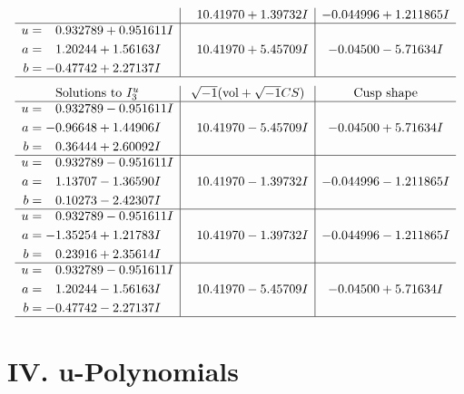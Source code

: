 \documentclass[1p]{elsarticle_modified}
\theoremstyle{definition}
\newcommand{\I}{\sqrt{-1}}
\begin{document}
$$\begin{array}{c|c|c}
 & \phantom{-}10.41970 + 1.39732 I & -0.044996 + 1.211865 I \\ \hline\begin{aligned}
u &= \phantom{-}0.932789 + 0.951611 I \\
a &= \phantom{-}1.20244 + 1.56163 I \\
b &= -0.47742 + 2.27137 I\end{aligned}
 & \phantom{-}10.41970 + 5.45709 I & -0.04500 - 5.71634 I\\
 \hline 
 \end{array}$$\newpage$$\begin{array}{c|c|c}  
\text{Solutions to }I^u_{3}& \I (\text{vol} + \sqrt{-1}CS) & \text{Cusp shape}\\
 \hline 
\begin{aligned}
u &= \phantom{-}0.932789 - 0.951611 I \\
a &= -0.96648 + 1.44906 I \\
b &= \phantom{-}0.36444 + 2.60092 I\end{aligned}
 & \phantom{-}10.41970 - 5.45709 I & -0.04500 + 5.71634 I \\ \hline\begin{aligned}
u &= \phantom{-}0.932789 - 0.951611 I \\
a &= \phantom{-}1.13707 - 1.36590 I \\
b &= \phantom{-}0.10273 - 2.42307 I\end{aligned}
 & \phantom{-}10.41970 - 1.39732 I & -0.044996 - 1.211865 I \\ \hline\begin{aligned}
u &= \phantom{-}0.932789 - 0.951611 I \\
a &= -1.35254 + 1.21783 I \\
b &= \phantom{-}0.23916 + 2.35614 I\end{aligned}
 & \phantom{-}10.41970 - 1.39732 I & -0.044996 - 1.211865 I \\ \hline\begin{aligned}
u &= \phantom{-}0.932789 - 0.951611 I \\
a &= \phantom{-}1.20244 - 1.56163 I \\
b &= -0.47742 - 2.27137 I\end{aligned}
 & \phantom{-}10.41970 - 5.45709 I & -0.04500 + 5.71634 I\\
 \hline 
 \end{array}$$\newpage
\newpage\renewcommand{\arraystretch}{1}
\centering \section*{ IV. u-Polynomials}
\end{document}
